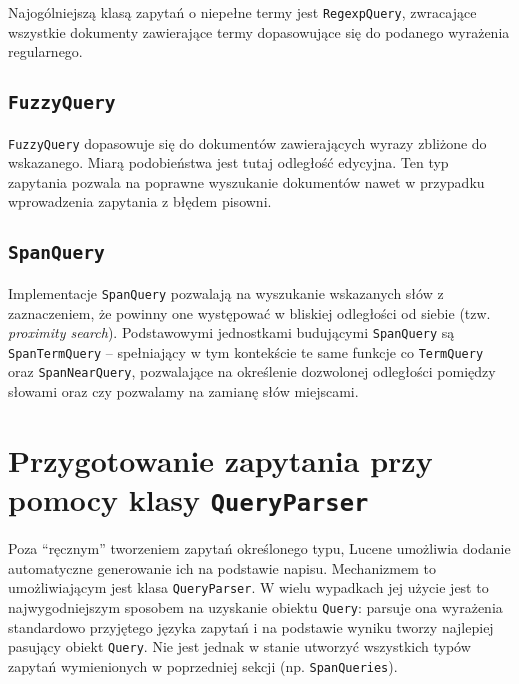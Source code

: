 Najogólniejszą klasą zapytań o niepełne termy jest \texttt{RegexpQuery}, zwracające wszystkie dokumenty zawierające termy dopasowujące się do podanego wyrażenia regularnego.

\subsection{\texttt{FuzzyQuery}}

\texttt{FuzzyQuery} dopasowuje się do dokumentów zawierających wyrazy zbliżone do wskazanego. Miarą podobieństwa jest tutaj odległość edycyjna. Ten typ zapytania pozwala na poprawne wyszukanie dokumentów nawet w przypadku wprowadzenia zapytania z błędem pisowni.

\subsection{\texttt{SpanQuery}}

Implementacje \texttt{SpanQuery} pozwalają na wyszukanie wskazanych słów z zaznaczeniem, że powinny one występować w bliskiej odległości od siebie (tzw. \emph{proximity search}). Podstawowymi jednostkami budującymi \texttt{SpanQuery} są \texttt{SpanTermQuery} -- spełniający w tym kontekście te same funkcje co \texttt{TermQuery} oraz \texttt{SpanNearQuery}, pozwalające na określenie dozwolonej odległości pomiędzy słowami oraz czy pozwalamy na zamianę słów miejscami.

\section{Przygotowanie zapytania przy pomocy klasy \texttt{QueryParser}}

Poza ``ręcznym'' tworzeniem zapytań określonego typu, Lucene umożliwia dodanie automatyczne generowanie ich na podstawie napisu. Mechanizmem to umożliwiającym jest klasa \texttt{QueryParser}. W wielu wypadkach jej użycie jest to najwygodniejszym sposobem na uzyskanie obiektu \texttt{Query}: parsuje ona wyrażenia standardowo przyjętego języka zapytań i na podstawie wyniku tworzy najlepiej pasujący obiekt \texttt{Query}. Nie jest jednak w stanie utworzyć wszystkich typów zapytań wymienionych w poprzedniej sekcji (np. \texttt{SpanQueries}).
